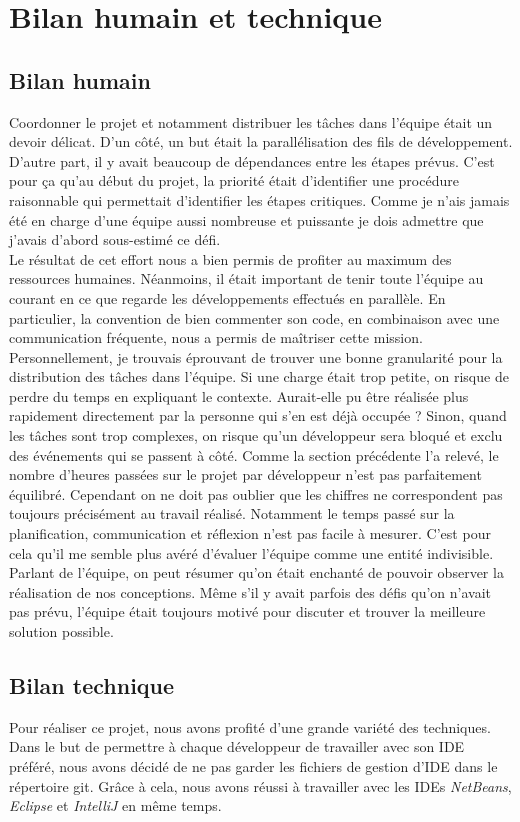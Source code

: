 \documentclass[10pt,a4paper]{book}
\begin{document}
\section{Bilan humain et technique}
\subsection{Bilan humain}
Coordonner le projet et notamment distribuer les tâches dans l'équipe était un devoir délicat. D'un côté, un but était la parallélisation des fils de développement. D'autre part, il y avait beaucoup de dépendances entre les étapes prévus. C'est pour ça qu'au début du projet, la priorité était d'identifier une procédure raisonnable qui permettait d'identifier les étapes critiques. Comme je n'ais jamais été en charge d'une équipe aussi nombreuse et puissante je dois admettre que j'avais d'abord sous-estimé ce défi.\\
Le résultat de cet effort nous a bien permis de profiter au maximum des ressources humaines. Néanmoins, il était important de tenir toute l'équipe au courant en ce que regarde les développements effectués en parallèle. En particulier, la convention de bien commenter son code, en combinaison avec une communication fréquente, nous a permis de maîtriser cette mission.\\
Personnellement, je trouvais éprouvant de trouver une bonne granularité pour la distribution des tâches dans l'équipe. Si une charge était trop petite, on risque de perdre du temps en expliquant le contexte. Aurait-elle pu être réalisée plus rapidement directement par la personne qui s'en est déjà occupée ? Sinon, quand les tâches sont trop complexes, on risque qu'un développeur sera bloqué et exclu des événements qui se passent à côté. Comme la section précédente l'a relevé, le nombre d'heures passées sur le projet par développeur n'est pas parfaitement équilibré. Cependant on ne doit pas oublier que les chiffres ne correspondent pas toujours précisément au travail réalisé. Notamment le temps passé sur la planification, communication et réflexion n'est pas facile à mesurer. C'est pour cela qu'il me semble plus avéré d'évaluer l'équipe comme une entité indivisible.\\
Parlant de l'équipe, on peut résumer qu'on était enchanté de pouvoir observer la réalisation de nos conceptions. Même s'il y avait parfois des défis qu'on n'avait pas prévu, l'équipe était toujours motivé pour discuter et trouver la meilleure solution possible.
\subsection{Bilan technique}
Pour réaliser ce projet, nous avons profité d'une grande variété des techniques. Dans le but de permettre à chaque développeur de travailler avec son IDE préféré, nous avons décidé de ne pas garder les fichiers de gestion d'IDE dans le répertoire git. Grâce à cela, nous avons réussi à travailler avec les IDEs \textit{NetBeans}, \textit{Eclipse} et \textit{IntelliJ} en même temps. 
\end{document}
